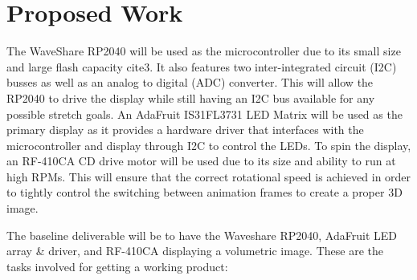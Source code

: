 \documentclass[11pt,journal]{IEEEtran}
\begin{document}


\section{Proposed Work}

The WaveShare RP2040 will be used as the microcontroller due to its small size and large flash capacity cite{3}. It also features two inter-integrated circuit (I2C) busses as well as an analog to digital (ADC) converter. This will allow the RP2040 to drive the display while still having an I2C bus available for any possible stretch goals. An AdaFruit IS31FL3731 LED Matrix will be used as the primary display as it provides a hardware driver that interfaces with the microcontroller and display through I2C to control the LEDs. To spin the display, an RF-410CA CD drive motor will be used due to its size and ability to run at high RPMs. This will ensure that the correct rotational speed is achieved in order to tightly control the switching between animation frames to create a proper 3D image. 

The baseline deliverable will be to have the Waveshare RP2040, AdaFruit LED array \& driver, and RF-410CA displaying a volumetric image. These are the tasks involved for getting a working product:
\end{document}
